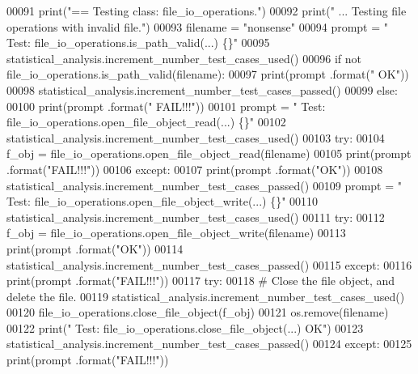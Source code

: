 \begin{DoxyCode}
00091         print(\textcolor{stringliteral}{"==   Testing class: file\_io\_operations."})
00092         print(\textcolor{stringliteral}{" ... Testing file operations with invalid file."})
00093         filename = \textcolor{stringliteral}{"nonsense"}
00094         prompt = \textcolor{stringliteral}{"  Test: file\_io\_operations.is\_path\_valid(...) \{\}"}
00095         statistical\_analysis.increment\_number\_test\_cases\_used()
00096         \textcolor{keywordflow}{if} \textcolor{keywordflow}{not} file\_io\_operations.is\_path\_valid(filename):
00097             print(prompt .format(\textcolor{stringliteral}{"  OK"}))
00098             statistical\_analysis.increment\_number\_test\_cases\_passed()
00099         \textcolor{keywordflow}{else}:
00100             print(prompt .format(\textcolor{stringliteral}{"  FAIL!!!"}))
00101         prompt = \textcolor{stringliteral}{"  Test: file\_io\_operations.open\_file\_object\_read(...) \{\}"}
00102         statistical\_analysis.increment\_number\_test\_cases\_used()
00103         \textcolor{keywordflow}{try}:
00104             f\_obj = file\_io\_operations.open\_file\_object\_read(filename)
00105             print(prompt .format(\textcolor{stringliteral}{"FAIL!!!"}))
00106         \textcolor{keywordflow}{except}:
00107             print(prompt .format(\textcolor{stringliteral}{"OK"}))
00108             statistical\_analysis.increment\_number\_test\_cases\_passed()
00109         prompt = \textcolor{stringliteral}{"  Test: file\_io\_operations.open\_file\_object\_write(...)    \{\}"}
00110         statistical\_analysis.increment\_number\_test\_cases\_used()
00111         \textcolor{keywordflow}{try}:
00112             f\_obj = file\_io\_operations.open\_file\_object\_write(filename)
00113             print(prompt .format(\textcolor{stringliteral}{"OK"}))
00114             statistical\_analysis.increment\_number\_test\_cases\_passed()
00115         \textcolor{keywordflow}{except}:
00116             print(prompt .format(\textcolor{stringliteral}{"FAIL!!!"}))
00117         \textcolor{keywordflow}{try}:
00118             \textcolor{comment}{#   Close the file object, and delete the file.}
00119             statistical\_analysis.increment\_number\_test\_cases\_used()
00120             file\_io\_operations.close\_file\_object(f\_obj)
00121             os.remove(filename)
00122             print(\textcolor{stringliteral}{" Test: file\_io\_operations.close\_file\_object(...)     OK"})
00123             statistical\_analysis.increment\_number\_test\_cases\_passed()
00124         \textcolor{keywordflow}{except}:
00125             print(prompt .format(\textcolor{stringliteral}{"FAIL!!!"}))

\end{DoxyCode}
